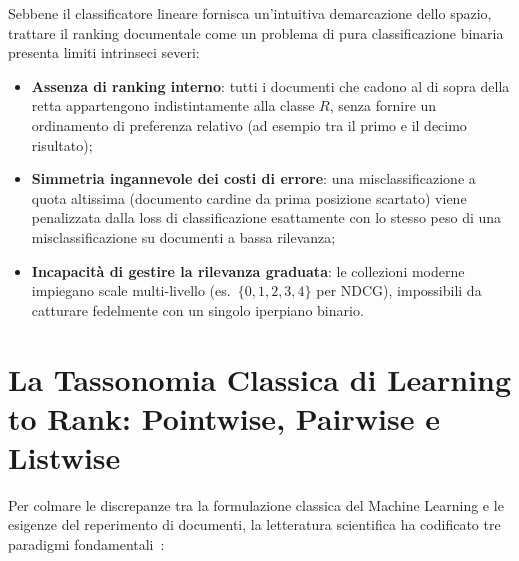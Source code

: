 Sebbene il classificatore lineare fornisca un'intuitiva demarcazione dello spazio, trattare il ranking documentale come un problema di pura classificazione binaria presenta limiti intrinseci severi:
\begin{itemize}
    \item \textbf{Assenza di ranking interno}: tutti i documenti che cadono al di sopra della retta appartengono indistintamente alla classe $R$, senza fornire un ordinamento di preferenza relativo (ad esempio tra il primo e il decimo risultato);
    \item \textbf{Simmetria ingannevole dei costi di errore}: una misclassificazione a quota altissima (documento cardine da prima posizione scartato) viene penalizzata dalla loss di classificazione esattamente con lo stesso peso di una misclassificazione su documenti a bassa rilevanza;
    \item \textbf{Incapacit\`a di gestire la rilevanza graduata}: le collezioni moderne impiegano scale multi-livello (es.~$\{0, 1, 2, 3, 4\}$ per NDCG), impossibili da catturare fedelmente con un singolo iperpiano binario.
\end{itemize}

\FloatBarrier
\section{La Tassonomia Classica di Learning to Rank: Pointwise, Pairwise e Listwise}
\label{sec:tassonomia-ltr-pointwise-pairwise-listwise}

Per colmare le discrepanze tra la formulazione classica del Machine Learning e le esigenze del reperimento di documenti, la letteratura scientifica ha codificato tre paradigmi fondamentali~\cite{liu2009}:

